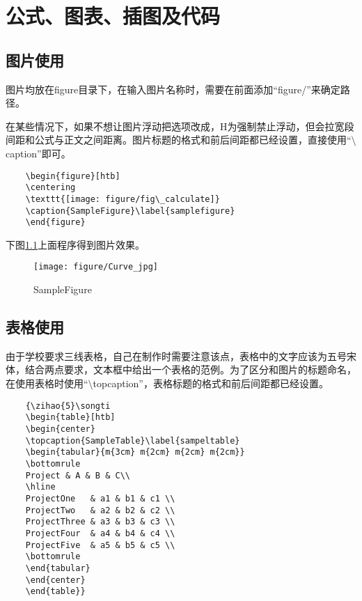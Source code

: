 \chapter{公式、图表、插图及代码}
\songti\xiaosi
\begin{spacing}{1.5}
	\section{图片使用}
	图片均放在figure目录下，在输入图片名称时，需要在前面添加“figure/”来确定路径。
	
	在某些情况下，如果不想让图片浮动把\fbox{[htb]}选项改成\fbox{[H]}，H为强制禁止浮动，但会拉宽段间距和公式与正文之间距离。图片标题的格式和前后间距都已经设置，直接使用“$\setminus$caption”即可。
	
	\begin{lstlisting}
	\begin{figure}[htb]
	\centering
	\texttt{[image: figure/fig\_calculate]}
	\caption{SampleFigure}\label{samplefigure}
	\end{figure}	
	\end{lstlisting}
	
	下图\ref{samplefigure}上面程序得到图片效果。
	
	\begin{figure}[htbp]
		\centering
		\texttt{[image: figure/Curve\_jpg]}
		\caption{SampleFigure}\label{samplefigure}
	\end{figure}
	
	\section{表格使用}
	由于学校要求三线表格，自己在制作时需要注意该点，表格中的文字应该为五号宋体，结合两点要求，文本框中给出一个表格的范例。为了区分和图片的标题命名，在使用表格时使用“$\setminus$topcaption”，表格标题的格式和前后间距都已经设置。
	
	\begin{lstlisting}
	{\zihao{5}\songti
	\begin{table}[htb]
	\begin{center}
	\topcaption{SampleTable}\label{sampeltable}
	\begin{tabular}{m{3cm} m{2cm} m{2cm} m{2cm}}
	\bottomrule
	Project & A & B & C\\
	\hline
	ProjectOne   & a1 & b1 & c1 \\
	ProjectTwo   & a2 & b2 & c2 \\
	ProjectThree & a3 & b3 & c3 \\
	ProjectFour  & a4 & b4 & c4 \\
	ProjectFive  & a5 & b5 & c5 \\
	\bottomrule
	\end{tabular}
	\end{center}
	\end{table}}
	\end{lstlisting}
	

\end{spacing}
